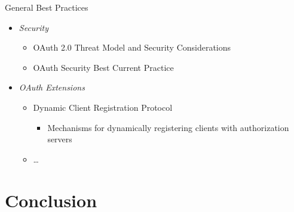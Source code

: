 \documentclass[aspectratio=169]{beamer}
\begin{document}
\begin{frame}{General Best Practices}
	\begin{itemize}
		\item \emph{Security}
		\begin{itemize}
			\item OAuth 2.0 Threat Model and Security Considerations \cite{RFC6819}
			\item OAuth Security Best Current Practice \cite{ietf-oauth-security}
		\end{itemize}
		\pause
		\item \emph{OAuth Extensions}
		\begin{itemize}
			\item Dynamic Client Registration Protocol \cite{RFC7591}
			\begin{itemize}
				\item Mechanisms for dynamically registering clients with authorization servers
			\end{itemize}
			\item \dots
		\end{itemize}
	\end{itemize}
\end{frame}

\section{Conclusion}
\end{document}

